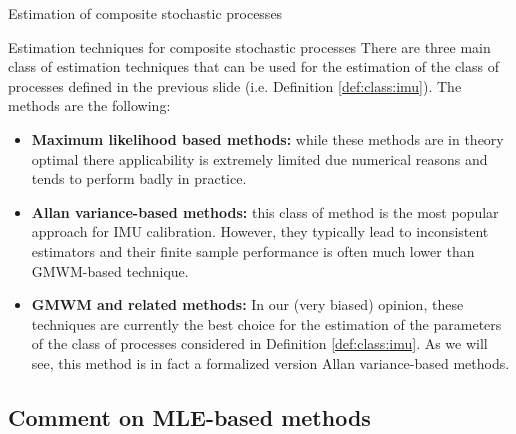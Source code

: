 \documentclass[envcountsect,usenames,dvipsnames]{beamer}
\DeclareMathOperator*{\cov}{cov}
\theoremstyle{mystyle}
\begin{document}
\begin{frame}{Estimation of composite stochastic processes}
\small

\begin{block}{Estimation techniques for composite stochastic processes}
There are three main class of estimation techniques that can be used for the estimation of the class of processes defined in the previous slide (i.e. Definition \ref{def:class:imu}). The methods are the following:
%
\begin{itemize}
    \item \textbf{{\color{beamer@UIUCblue}Maximum likelihood based methods:}} while these methods are in theory optimal there applicability is extremely limited due numerical reasons and tends to perform badly in practice.
    \item \textbf{{\color{beamer@UIUCblue}Allan variance-based methods:}} this class of method is the most popular approach for IMU calibration. However, they typically lead to inconsistent estimators and their finite sample performance is often much lower than GMWM-based technique.  
    \item \textbf{{\color{beamer@UIUCblue}GMWM and related methods:}} In our (very biased) opinion, these techniques are currently the best choice for the estimation of the parameters of the class of processes considered in Definition \ref{def:class:imu}. As we will see, this method is in fact a formalized version Allan variance-based methods.
\end{itemize}
\end{block}
\end{frame}

%
%
%
\subsection{Comment on MLE-based methods}
\end{document}
